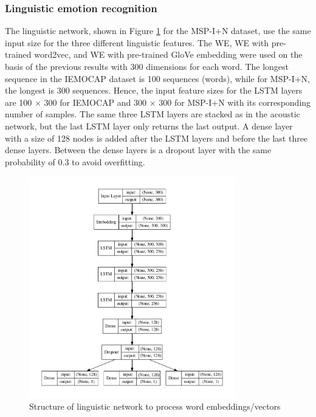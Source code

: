 \subsubsection{Linguistic emotion recognition}
The linguistic network, shown in Figure \ref{fig:text_model} for the MSP-I+N
dataset, use the same input size for the three different linguistic features.
The WE, WE with pre-trained word2vec, and WE with pre-trained GloVe embedding
were used on the basis of the previous results with 300 dimensions for each
word. The longest sequence in the IEMOCAP dataset is 100 sequences (words),
while for MSP-I+N, the longest is 300 sequences. Hence, the input feature sizes
for the LSTM layers are 100 $\times$ 300 for IEMOCAP and 300 $\times$ 300 for
MSP-I+N with its corresponding number of samples. The same three LSTM layers
are stacked as in the acoustic network, but the last LSTM layer only returns
the last output. A dense layer with a size of 128 nodes is added after the
LSTM layers and before the last three dense layers. Between the dense layers is
a dropout layer with the same probability of 0.3 to avoid overfitting.

\begin{figure}[htpb]
\centering
\includegraphics[width=0.8\textwidth]{../fig/model_text.pdf}
\caption{Structure of linguistic network to process word embeddings/vectors}
\label{fig:text_model}
\end{figure}


